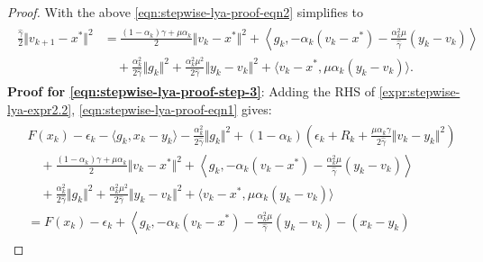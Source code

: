 \documentclass[12pt]{article}
\begin{document}
\begin{proof}
{        }
        With the above \eqref{eqn:stepwise-lya-proof-eqn2} simplifies to
        {\small
        \begin{align}\label{expr:stepwise-lya-expr2.2}
        \begin{split}
            \frac{\hat \gamma}{2}\Vert v_{k + 1} - x^*\Vert^2
            &=
            \frac{(1 - \alpha_k)\gamma + \mu \alpha_k}{2} \Vert v_k - x^*\Vert^2
            +
            \left\langle g_k,
                - \alpha_k(v_k - x^*)
                - \frac{\alpha_k^2\mu}{\hat \gamma}(y_k - v_k)
            \right\rangle
            \\
            & \quad
                + \frac{\alpha_k^2}{2\hat \gamma}\Vert g_k\Vert^2
                + \frac{\alpha_k^2 \mu^2}{2\hat \gamma}\Vert y_k - v_k\Vert^2
                + \langle v_k - x^*, \mu\alpha_k(y_k - v_k)\rangle.
        \end{split}
        \end{align}
        }
        \textbf{Proof for \eqref{eqn:stepwise-lya-proof-step-3}}:
        Adding the RHS of \eqref{expr:stepwise-lya-expr2.2}, \eqref{eqn:stepwise-lya-proof-eqn1} gives:
        \begin{align}
        \begin{split}
            &
            F(x_k) - \epsilon_k - \langle  g_k, x_k - y_k\rangle
            - \frac{\alpha_k^2}{2\hat \gamma}\Vert g_k\Vert^2
            + (1 - \alpha_k)
            \left(
                \epsilon_k + R_k +
                \frac{\mu\alpha_k\gamma}{2\hat \gamma}
                \Vert v_k - y_k\Vert^2
            \right)
            \\
            &\quad
                +
                \frac{(1 - \alpha_k)\gamma + \mu \alpha_k}{2}
                \Vert v_k - x^*\Vert^2
                +
                \left\langle g_k,
                    - \alpha_k(v_k - x^*)
                    - \frac{\alpha_k^2\mu}{\hat \gamma}(y_k - v_k)
                \right\rangle
            \\
            & \quad
                + \frac{\alpha_k^2}{2\hat \gamma}\Vert g_k\Vert^2
                + \frac{\alpha_k^2 \mu^2}{2\hat \gamma}\Vert y_k - v_k\Vert^2
                + \langle v_k - x^*, \mu\alpha_k(y_k - v_k)\rangle
            \\
            &=
            F(x_k) - \epsilon_k
            + \left\langle
                g_k,
                - \alpha_k(v_k - x^*)
                - \frac{\alpha_k^2\mu}{\hat \gamma}(y_k - v_k)
                - (x_k - y_k)

\end{split}
\end{align}
\end{proof}
\end{document}

